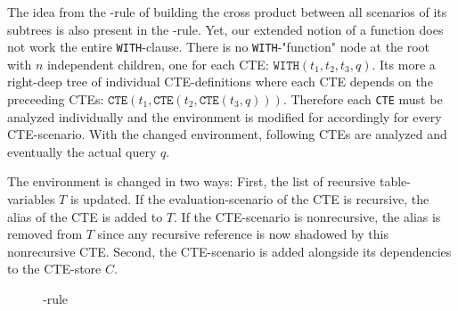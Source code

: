 The idea from the \REXPR-rule of building the cross product between all scenarios of its subtrees is also present in the \RCTE-rule. Yet, our extended notion of a function does not work the entire \texttt{WITH}-clause. There is no \texttt{WITH}-"function" node at the root with $n$ independent children, one for each CTE: $\texttt{WITH}(t_1, t_2, t_3, q)$. Its more a right-deep tree of individual CTE-definitions where each CTE depends on the preceeding CTEs: $\texttt{CTE}(t_1, \texttt{CTE}(t_2, \texttt{CTE}(t_3, q)))$. Therefore each \texttt{CTE} must be analyzed individually and the environment is modified for accordingly for every CTE-scenario. With the changed environment, following CTEs are analyzed and eventually the actual query $q$.

The environment is changed in two ways: First, the list of recursive table-variables $T$ is updated. If the evaluation-scenario of the CTE is recursive, the alias of the CTE is added to $T$. If the CTE-scenario is nonrecursive, the alias is removed from $T$ since any recursive reference is now shadowed by this nonrecursive CTE. Second, the CTE-scenario is added alongside its dependencies to the CTE-store $C$.

\begin{figure}[h!]
    \centering\footnotesize
{}
    \caption{\RCTE-rule}
    \label{rule:cte}
\end{figure}

